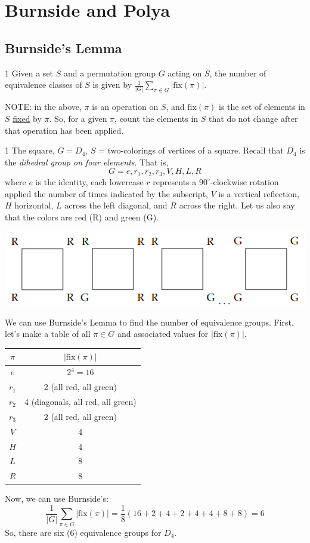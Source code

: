 \section{Burnside and Polya}

\subsection{Burnside's Lemma}
\begin{lemma}1
    Given a set $S$ and a permutation group $G$ acting on $S$, the number of 
    equivalence classes of $S$ is given by $\frac 1{|G|}\sum_{\pi \in G}|\mathrm{fix}(\pi)|$. 
\end{lemma}
NOTE: in the above, $\pi$ is an operation on $S$, and $\mathrm{fix}(\pi)$ is the 
set of elements in $S$ \underline{fixed} by $\pi$. So, for a given $\pi$, count the 
elements in $S$ that do not change after that operation has been applied. 

\begin{example}1
    The square, $G = D_4$, $S$ = two-colorings of vertices of a square.
    Recall that $D_4$ is the \textit{dihedral group on four elements}. That is, 
    \[ G = e, r_1, r_2, r_3, V, H, L, R \]
    where $e$ is the identity, each lowercase $r$ represents a $90^\circ$-clockwise rotation
applied the number of times indicated by the subscript, $V$ is a vertical reflection,
 $H$ horizontal, $L$ across the left diagonal, and $R$ across the right. Let
us also say that the colors are red (R) and green (G).
\begin{center}
    \includegraphics[scale=1]{figures/sqaure_colorings.png}
\end{center}
We can use Burnside's Lemma to find the number of equivalence groups. First,
let's make a table of all $\pi \in G$ and associated values for $|\mathrm{fix}(\pi)|$.
\begin{center}
    \begin{tabular}{c|c}
        $\pi$ & $|\mathrm{fix}(\pi)|$ \\ \hline
        $e$ & $2^4 = 16$ \\
        $r_1$ & 2 (all red, all green) \\
        $r_2$ & 4 (diagonals, all red, all green) \\
        $r_3$ & 2 (all red, all green) \\
        $V$ & 4 \\
        $H$ & 4 \\ 
        $L$ & 8 \\
        $R$ & 8 
    \end{tabular}
\end{center}
Now, we can use Burnside's: 
\[
    \frac 1{|G|}\sum_{\pi \in G}|\mathrm{fix}(\pi)| = 
    \frac 18 (16 + 2 + 4 + 2 + 4 + 4 + 8 + 8) = \boxed 6
\]
So, there are six (6) equivalence groups for $D_4$. 
\end{example}

